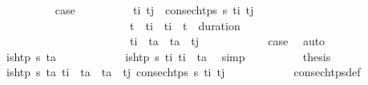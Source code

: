 \begin{isabellebody}
\isanewline
\ \ \ \ \ \ \ \ \isamarkupfalse%
\ {\isacharquery}{\kern0pt}case{}\isanewline
\ \ \ \ \ \ \ \ \isamarkupfalse%
\ t\isactrlsub i{\isacharprime}{\kern0pt}\ t\isactrlsub j{\isacharprime}{\kern0pt}\ \ {\isachardoublequoteopen}consec{\isacharunderscore}{\kern0pt}htps\ {\isasympi}s\ t\isactrlsub i{\isacharprime}{\kern0pt}\ t\isactrlsub j{\isacharprime}{\kern0pt}{\isachardoublequoteclose}\ \isanewline
\ \ \ \ \ \ \ \ \ \ \ \ \ \ \ \ \ \ \ \ \ \ \ {\isachardoublequoteopen}t\isactrlsub {\isasympi}\ {\isasymle}\ t\isactrlsub i{\isacharprime}{\kern0pt}\ {\isasymand}\ t\isactrlsub i{\isacharprime}{\kern0pt}\ {\isacharless}{\kern0pt}\ t\isactrlsub {\isasympi}\ {\isacharplus}{\kern0pt}\ duration\ {\isasympi}{\isachardoublequoteclose}\ \isanewline
\ \ \ \ \ \ \ \ \ \ \ \ \ \ \ \ \ \ \ \ \ \ \ {\isachardoublequoteopen}t\isactrlsub i{\isacharprime}{\kern0pt}\ {\isacharless}{\kern0pt}\ t\isactrlsub a\ {\isasymand}\ t\isactrlsub a\ {\isacharless}{\kern0pt}\ t\isactrlsub j{\isacharprime}{\kern0pt}{\isachardoublequoteclose}\isanewline
\ \ \ \ \ \ \ \ \ \ \isamarkupfalse%
\ {\isacartoucheopen}{\isacharquery}{\kern0pt}case{}{\isacartoucheclose}\ \isamarkupfalse%
\ auto\isanewline
\ \ \ \ \ \ \ \ \isamarkupfalse%
\ {\isachardoublequoteopen}is{\isacharunderscore}{\kern0pt}htp\ {\isasympi}s\ t\isactrlsub a{\isachardoublequoteclose}\isanewline
\ \ \ \ \ \ \ \ \ \ \isamarkupfalse%
\ {\isacartoucheopen}is{\isacharunderscore}{\kern0pt}htp\ {\isasympi}s\ t\isactrlsub i{\isacartoucheclose}\ {\isacartoucheopen}t\isactrlsub i\ {\isacharequal}{\kern0pt}\ t\isactrlsub a{\isacartoucheclose}\ \isamarkupfalse%
\ simp\isanewline
\ \ \ \ \ \ \ \ \isamarkupfalse%
\ {\isacharquery}{\kern0pt}thesis\isanewline
\ \ \ \ \ \ \ \ \ \ \isamarkupfalse%
\ {\isacartoucheopen}is{\isacharunderscore}{\kern0pt}htp\ {\isasympi}s\ t\isactrlsub a{\isacartoucheclose}\ {\isacartoucheopen}t\isactrlsub i{\isacharprime}{\kern0pt}\ {\isacharless}{\kern0pt}\ t\isactrlsub a\ {\isasymand}\ t\isactrlsub a\ {\isacharless}{\kern0pt}\ t\isactrlsub j{\isacharprime}{\kern0pt}{\isacartoucheclose}\ {\isacartoucheopen}consec{\isacharunderscore}{\kern0pt}htps\ {\isasympi}s\ t\isactrlsub i{\isacharprime}{\kern0pt}\ t\isactrlsub j{\isacharprime}{\kern0pt}{\isacartoucheclose}\isanewline
\ \ \ \ \ \ \ \ \ \ \isamarkupfalse%
\ consec{\isacharunderscore}{\kern0pt}htps{\isacharunderscore}{\kern0pt}def\ \isamarkupfalse%

\end{isabellebody}
